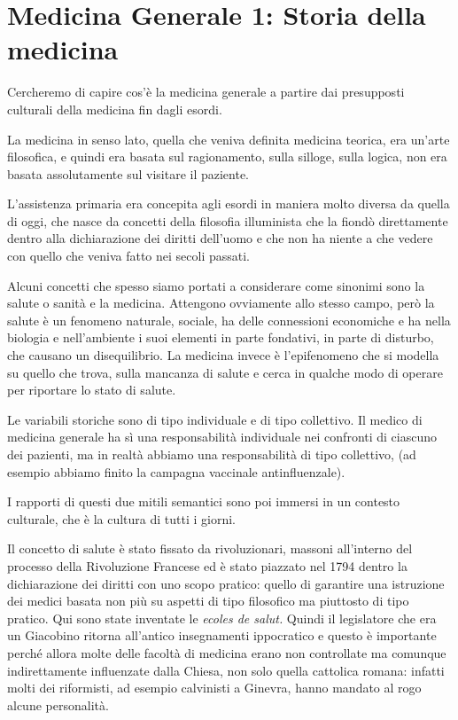 \section{Medicina Generale 1: Storia della medicina}

Cercheremo di capire cos'è la medicina generale a partire dai
presupposti culturali della medicina fin dagli esordi.

La medicina in senso lato, quella che veniva definita medicina teorica,
era un'arte filosofica, e quindi era basata sul ragionamento, sulla
silloge, sulla logica, non era basata assolutamente sul visitare il
paziente.

L'assistenza primaria era concepita agli esordi in maniera molto diversa
da quella di oggi, che nasce da concetti della filosofia illuminista che
la fiondò direttamente dentro alla dichiarazione dei diritti dell'uomo e
che non ha niente a che vedere con quello che veniva fatto nei secoli
passati.

Alcuni concetti che spesso siamo portati a considerare come sinonimi
sono la salute o sanità e la medicina. Attengono ovviamente allo stesso
campo, però la salute è un fenomeno naturale, sociale, ha delle
connessioni economiche e ha nella biologia e nell'ambiente i suoi
elementi in parte fondativi, in parte di disturbo, che causano un
disequilibrio. La medicina invece è l'epifenomeno che si modella su
quello che trova, sulla mancanza di salute e cerca in qualche modo di
operare per riportare lo stato di salute.

Le variabili storiche sono di tipo individuale e di tipo collettivo. Il
medico di medicina generale ha sì una responsabilità individuale nei
confronti di ciascuno dei pazienti, ma in realtà abbiamo una
responsabilità di tipo collettivo, (ad esempio abbiamo finito la
campagna vaccinale antinfluenzale).

I rapporti di questi due mitili semantici sono poi immersi in un
contesto culturale, che è la cultura di tutti i giorni.

Il concetto di salute è stato fissato da rivoluzionari, massoni
all'interno del processo della Rivoluzione Francese ed è stato piazzato
nel 1794 dentro la dichiarazione dei diritti con uno scopo pratico:
quello di garantire una istruzione dei medici basata non più su aspetti
di tipo filosofico ma piuttosto di tipo pratico. Qui sono state
inventate le \emph{ecoles de salut.} Quindi il legislatore che era un
Giacobino ritorna all'antico insegnamenti ippocratico e questo è
importante perché allora molte delle facoltà di medicina erano non
controllate ma comunque indirettamente influenzate dalla Chiesa, non
solo quella cattolica romana: infatti molti dei riformisti, ad esempio
calvinisti a Ginevra, hanno mandato al rogo alcune personalità.

